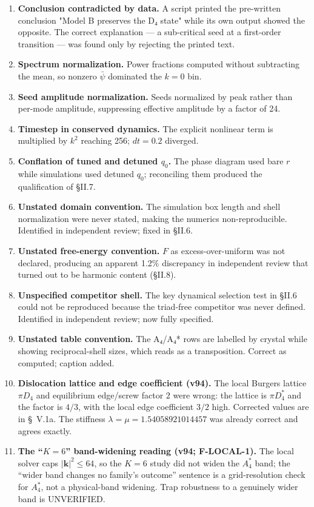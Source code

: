 \documentclass[a4paper,11pt]{article}
\begin{document}
\begin{enumerate}
\item \textbf{Conclusion contradicted by data.} A script printed the pre-written conclusion "Model B preserves the D₄ state" while its own output showed the opposite. The correct explanation — a sub-critical seed at a first-order transition — was found only by rejecting the printed text.
\item \textbf{Spectrum normalization.} Power fractions computed without subtracting the mean, so nonzero $\bar\psi$ dominated the $k=0$ bin.
\item \textbf{Seed amplitude normalization.} Seeds normalized by peak rather than per-mode amplitude, suppressing effective amplitude by a factor of 24.
\item \textbf{Timestep in conserved dynamics.} The explicit nonlinear term is multiplied by $k^2$ reaching 256; $dt=0.2$ diverged.
\item \textbf{Conflation of tuned and detuned $q_0$.} The phase diagram used bare $r$ while simulations used detuned $q_0$; reconciling them produced the qualification of §II.7.
\item \textbf{Unstated domain convention.} The simulation box length and shell normalization were never stated, making the numerics non-reproducible. Identified in independent review; fixed in §II.6.
\item \textbf{Unstated free-energy convention.} $F$ as excess-over-uniform was not declared, producing an apparent 1.2\% discrepancy in independent review that turned out to be harmonic content (§II.8).
\item \textbf{Unspecified competitor shell.} The key dynamical selection test in §II.6 could not be reproduced because the triad-free competitor was never defined. Identified in independent review; now fully specified.
\item \textbf{Unstated table convention.} The A₄/A₄* rows are labelled by crystal while showing reciprocal-shell sizes, which reads as a transposition. Correct as computed; caption added.
\item \textbf{Dislocation lattice and edge coefficient (v94).} The local Burgers lattice $\pi D_4$ and equilibrium edge/screw factor $2$ were wrong: the lattice is $\pi D_4^*$ and the factor is $4/3$, with the local edge coefficient $3/2$ high. Corrected values are in \S~V.1a. The stiffness $\lambda=\mu=1.54058921014457$ was already correct and agrees exactly.
\item \textbf{The ``$K=6$'' band-widening reading (v94; F-LOCAL-1).} The local solver caps $|\mathbf{k}|^2\leq64$, so the $K=6$ study did not widen the $A_4^*$ band; the ``wider band changes no family's outcome'' sentence is a grid-resolution check for $A_4^*$, not a physical-band widening. Trap robustness to a genuinely wider band is UNVERIFIED.
\end{enumerate}
\end{document}
